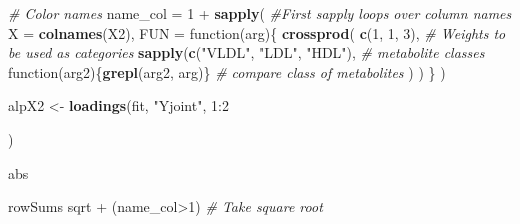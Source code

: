 \documentclass[]{article}
\newenvironment{Shaded}{\begin{snugshade}}{\end{snugshade}}
\newcommand{\KeywordTok}[1]{\textcolor[rgb]{0.13,0.29,0.53}{\textbf{{#1}}}}
\newcommand{\DataTypeTok}[1]{\textcolor[rgb]{0.13,0.29,0.53}{{#1}}}
\newcommand{\DecValTok}[1]{\textcolor[rgb]{0.00,0.00,0.81}{{#1}}}
\newcommand{\StringTok}[1]{\textcolor[rgb]{0.31,0.60,0.02}{{#1}}}
\newcommand{\CommentTok}[1]{\textcolor[rgb]{0.56,0.35,0.01}{\textit{{#1}}}}
\newcommand{\NormalTok}[1]{{#1}}
\begin{document}
\begin{Shaded}
\begin{Highlighting}[]
\CommentTok{# Color names}
\NormalTok{name_col =}\StringTok{ }\DecValTok{1} \NormalTok{+}\StringTok{ }\KeywordTok{sapply}\NormalTok{( }\CommentTok{#First sapply loops over column names}
  \DataTypeTok{X =} \KeywordTok{colnames}\NormalTok{(X2),}
  \DataTypeTok{FUN =} \NormalTok{function(arg)\{}
    \KeywordTok{crossprod}\NormalTok{(}
      \KeywordTok{c}\NormalTok{(}\DecValTok{1}\NormalTok{, }\DecValTok{1}\NormalTok{, }\DecValTok{3}\NormalTok{), }\CommentTok{# Weights to be used as categories}
      \KeywordTok{sapply}\NormalTok{(}\KeywordTok{c}\NormalTok{(}\StringTok{"VLDL"}\NormalTok{, }\StringTok{"LDL"}\NormalTok{, }\StringTok{"HDL"}\NormalTok{), }\CommentTok{# metabolite classes}
             \NormalTok{function(arg2)\{}\KeywordTok{grepl}\NormalTok{(arg2, arg)\} }\CommentTok{# compare class of metabolites}
      \NormalTok{)}
    \NormalTok{)}
    \NormalTok{\}}
  \NormalTok{)}

\NormalTok{alpX2 <-}\StringTok{ }\KeywordTok{loadings}\NormalTok{(fit, }\StringTok{"Yjoint"}\NormalTok{, }\DecValTok{1}\NormalTok{:}\DecValTok{2}\NormalTok{) %
\StringTok{  }\NormalTok{abs %
\StringTok{  }\NormalTok{rowSums %
\StringTok{  }\NormalTok{sqrt +}\StringTok{ }\NormalTok{(name_col>}\DecValTok{1}\NormalTok{) }\CommentTok{# Take square root}

}}}
\end{Highlighting}
\end{Shaded}
\end{document}
